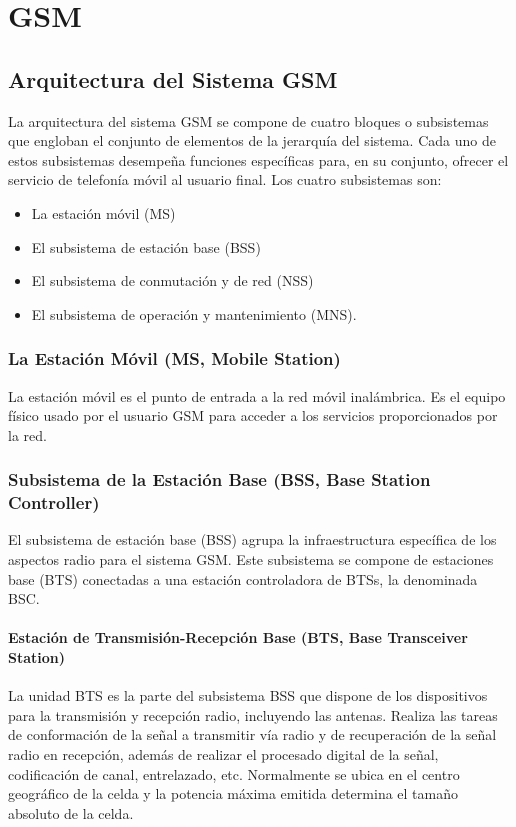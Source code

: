 \chapter{GSM}
\label{AppendixG}

\section{Arquitectura del Sistema GSM}

La arquitectura del sistema GSM se compone de cuatro bloques o subsistemas que engloban el conjunto de elementos de la jerarqu\'ia del sistema. Cada uno de estos subsistemas desempe\~na funciones espec\'ificas para, en su conjunto, ofrecer el servicio de telefon\'ia m\'ovil al usuario final. Los cuatro subsistemas son:

\begin{itemize}
\item La estaci\'on m\'ovil (MS)
\item El subsistema de estaci\'on base (BSS)
\item El subsistema de conmutaci\'on y de red (NSS)
\item El subsistema de operaci\'on y mantenimiento (MNS).
\end{itemize}


\subsection{La Estaci\'on M\'ovil (MS, Mobile Station)}
La estaci\'on m\'ovil es el punto de entrada a la red m\'ovil inal\'ambrica. Es el equipo f\'isico usado por el usuario GSM para acceder a los servicios proporcionados por la red.

\subsection{Subsistema de la Estaci\'on Base (BSS, Base Station Controller)}
\label{sec:bss}
El subsistema de estaci\'on base (BSS) agrupa la infraestructura espec\'ifica de los aspectos radio para el sistema GSM. Este subsistema se compone de estaciones base (BTS) conectadas a una estaci\'on controladora de BTSs, la denominada BSC.

\subsubsection{Estaci\'on de Transmisi\'on-Recepci\'on Base (BTS, Base Transceiver Station)}
\label{sec:bts}
La unidad BTS es la parte del subsistema BSS que dispone de los dispositivos para la transmisi\'on y recepci\'on radio, incluyendo las antenas. Realiza las tareas de conformaci\'on de la se\~nal a transmitir v\'ia radio y de recuperaci\'on de la se\~nal radio en recepci\'on, adem\'as de realizar el procesado digital de la se\~nal, codificaci\'on de canal, entrelazado, etc. Normalmente se ubica en el centro geogr\'afico de la celda y la potencia m\'axima emitida determina el tama\~no absoluto de la celda.

